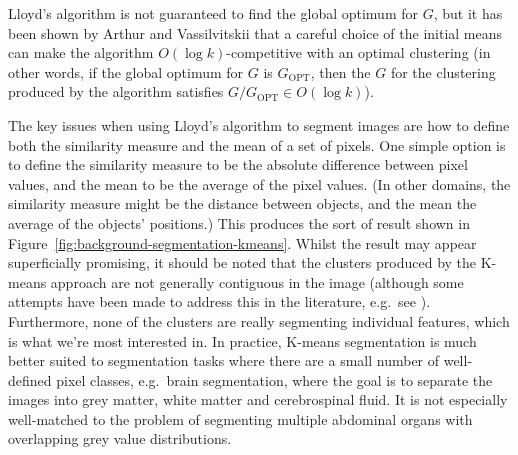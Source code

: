 \noindent Lloyd's algorithm is not guaranteed to find the global optimum for $G$, but it has been shown by Arthur and Vassilvitskii \cite{arthur07} that a careful choice of the initial means can make the algorithm $O(\log k)$-competitive with an optimal clustering (in other words, if the global optimum for $G$ is $G_{\mbox{OPT}}$, then the $G$ for the clustering produced by the algorithm satisfies $G / G_{\mbox{OPT}} \in O(\log k)$).

The key issues when using Lloyd's algorithm to segment images are how to define both the similarity measure and the mean of a set of pixels. One simple option is to define the similarity measure to be the absolute difference between pixel values, and the mean to be the average of the pixel values. (In other domains, the similarity measure might be the distance between objects, and the mean the average of the objects' positions.) This produces the sort of result shown in Figure~\ref{fig:background-segmentation-kmeans}. Whilst the result may appear superficially promising, it should be noted that the clusters produced by the K-means approach are not generally contiguous in the image (although some attempts have been made to address this in the literature, e.g.~see \cite{luo03,ilea06}). Furthermore, none of the clusters are really segmenting individual features, which is what we're most interested in. In practice, K-means segmentation is much better suited to segmentation tasks where there are a small number of well-defined pixel classes, e.g.~brain segmentation, where the goal is to separate the images into grey matter, white matter and cerebrospinal fluid. It is not especially well-matched to the problem of segmenting multiple abdominal organs with overlapping grey value distributions.

